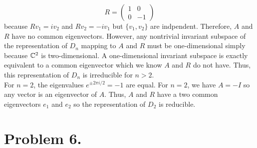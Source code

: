\documentclass[12pt]{extarticle}
\begin{document}
\begin{enumerate}
\[ R = 
\begin{pmatrix}
1 & 0 \\
0 & -1
\end{pmatrix} \]
because $R v_1 = i v_2$ and $R v_2 = - i v_1$ but $\{ v_1, v_2 \}$ are indpendent. Therefore, $A$ and $R$ have no common eigenvectors. However, any nontrivial invariant subspace of the representation of $D_n$ mapping to $A$ and $R$ must be one-dimensional simply because $\mathbb{C}^2$ is two-dimensional. A one-dimensional invariant subspace is exactly equivalent to a common eigenvector which we know $A$ and $R$ do not have. Thus, this representation of $D_n$ is irreducible for $n > 2$. \bigskip \\
For $n = 2$, the eigenvalues $e^{ \pm 2 \pi i / 2} = - 1$ are equal. For $n = 2$, we have $A = - I$ so any vector is an eigenvector of $A$. Thus, $A$ and $R$ have a two common eigenvectors $e_1$ and $e_2$ so the representation of $D_2$ is reducible.       
\end{enumerate}

\section*{Problem 6.}
\end{document}
